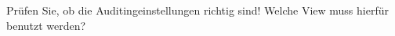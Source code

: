     \item Prüfen Sie, ob die Auditingeinstellungen richtig sind! Welche View muss hierfür benutzt werden?
